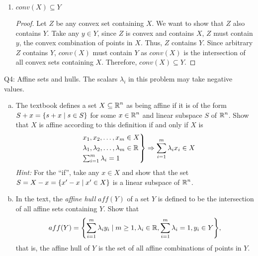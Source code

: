 \documentclass{article}
\begin{document}
\begin{solution}
\begin{enumerate}
{\begin{proof}
            \end{proof}
        }
        \item $conv(X)\subseteq Y$ {
            \begin{proof}
                Let $Z$ be any convex set containing $X$. We want to show that $Z$ also contains $Y$. Take any $y\in Y$, since $Z$ is convex and contains $X$, $Z$ must contain $y$, the convex combination of points in $X$. Thus, $Z$ contains $Y$. Since arbitrary $Z$ contains $Y$, $conv(X)$ must contain $Y$ as $conv(X)$ is the intersection of all convex sets containing $X$. Therefore, $conv(X)\subseteq Y$.
            \end{proof}
        }
    \end{enumerate}
\end{solution}

\begin{problem}
    {Q4: Affine sets and hulls.}
    The scalars $\lambda_i$ in this problem may take negative values.
    \begin{enumerate}[(a)]
        \item The textbook defines a set $X\subseteq\R^n$ as being affine if it is of the form $S+x=\braces*{s+x\mid s\in S}$ for some $x\in\R^n$ and linear subspace $S$ of $\R^n$. Show that $X$ is affine according to this definition if and only if $X$ is
        \begin{equation*}
            \begin{rcases}
                & x_1, x_2, \ldots, x_m \in X \\
                & \lambda_1, \lambda_2, \ldots, \lambda_m \in \R \\
                & \sum_{i=1}^m \lambda_i = 1
            \end{rcases}
            \Rightarrow \sum_{i=1}^{m}\lambda_i x_i\in X
        \end{equation*}
        \textit{Hint:} For the ``if'', take any $x\in X$ and show that the set $S=X-x=\braces*{x'-x\mid x'\in X}$ is a linear subspace of $\R^n$.
        \item In the text, the \textit{affine hull} $aff(Y)$ of a set $Y$ is defined to be the intersection of all affine sets containing $Y$. Show that
        \[
            aff(Y)=\braces*{\sum_{i=1}^m\lambda_iy_i\mid m\geq1, \lambda_i\in\R, \sum_{i=1}^m\lambda_i=1, y_i\in Y},
        \]
        that is, the affine hull of $Y$ is the set of all affine combinations of points in $Y$.
    \end{enumerate}
\end{problem}
\end{document}
